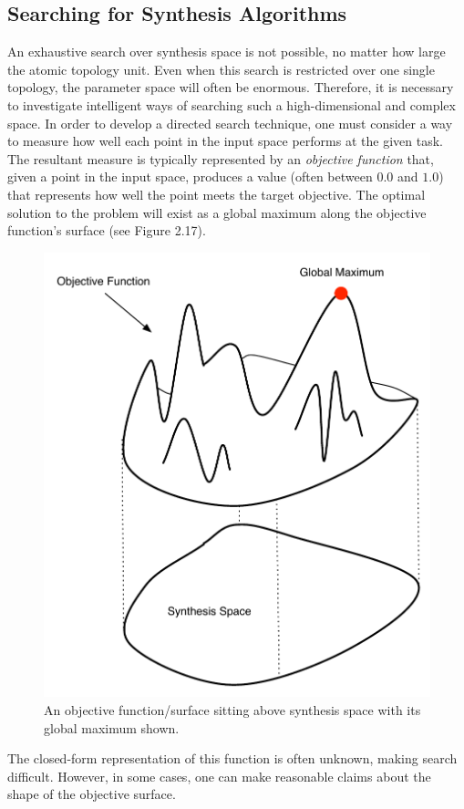 \documentclass[12pt]{report} 	%
\numberwithin{figure}{chapter}
\numberwithin{table}{chapter}
\numberwithin{equation}{chapter}
\begin{document}
\begin{flushleft}
\subsection{Searching for Synthesis Algorithms}
An exhaustive search over synthesis space is not possible, no matter how large the atomic topology unit. Even when this search is restricted over one single topology, the parameter space will often be enormous. Therefore, it is necessary to investigate intelligent ways of searching such a high-dimensional and complex space. In order to develop a directed search technique, one must consider a way to measure how well each point in the input space performs at the given task. The resultant measure is typically represented by an \textit{objective function} that, given a point in the input space, produces a value (often between $0.0$ and $1.0$) that represents how well the point meets the target objective. The optimal solution to the problem will exist as a global maximum along the objective function's surface (see Figure 2.17). \begin{figure}[h!]
\begin{center}
\includegraphics[scale=0.7]{FitnessFunction}
\caption[Fitness function]{An objective function/surface sitting above synthesis space with its global maximum shown.}
\end{center}
\end{figure}
The closed-form representation of this function is often unknown, making search difficult. However, in some cases, one can make reasonable claims about the shape of the objective surface.


\end{flushleft}
\end{document}
